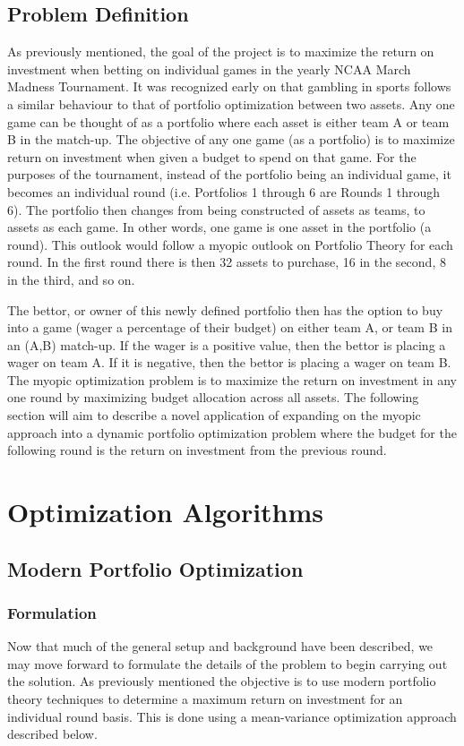 \documentclass[12pt]{article}
\begin{document}
\subsection{Problem Definition}
As previously mentioned, the goal of the project is to maximize the return on investment when betting on individual games in the yearly NCAA March Madness Tournament.
It was recognized early on that gambling in sports follows a similar behaviour to that of portfolio optimization between two assets. 
Any one game can be thought of as a portfolio where each asset is either team A or team B in the match-up.
The objective of any one game (as a portfolio) is to maximize return on investment when given a budget to spend on that game.
For the purposes of the tournament, instead of the portfolio being an individual game, it becomes an individual round (i.e. Portfolios 1 through 6 are Rounds 1 through 6).
The portfolio then changes from being constructed of assets as teams, to assets as each game.
In other words, one game is one asset in the portfolio (a round).
This outlook would follow a myopic outlook on Portfolio Theory for each round.
In the first round there is then 32 assets to purchase, 16 in the second, 8 in the third, and so on.

The bettor, or owner of this newly defined portfolio then has the option to buy into a game (wager a percentage of their budget) on either team A, or team B in an (A,B) match-up. 
If the wager is a positive value, then the bettor is placing a wager on team A.
If it is negative, then the bettor is placing a wager on team B.
The myopic optimization problem is to maximize the return on investment in any one round by maximizing budget allocation across all assets. 
The following section will aim to describe a novel application of expanding on the myopic approach into a dynamic portfolio optimization problem where the budget for the following round is the return on investment from the previous round.

\newpage
\section{Optimization Algorithms}
\subsection{Modern Portfolio Optimization}
\subsubsection{Formulation}
Now that much of the general setup and background have been described, we may move forward to formulate the details of the problem to begin carrying out the solution.
As previously mentioned the objective is to use modern portfolio theory techniques to determine a maximum return on investment for an individual round basis.
This is done using a mean-variance optimization approach described below.
\end{document}

